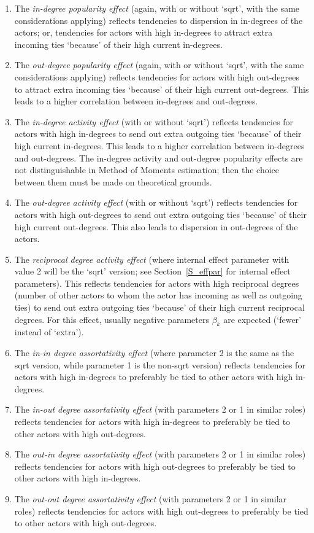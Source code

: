 \documentclass[a4paper,fleqn,11pt]{article}
\newcommand{\+}{\, + \,}
\begin{document}
\begin{enumerate}
\item The \emph{in-degree popularity effect} (again, with or without `sqrt',
     with the same considerations applying)
     reflects tendencies to dispersion in in-degrees of the actors;
     or, tendencies for actors with high in-degrees to attract extra incoming ties
     `because' of their high current in-degrees.
\item The \emph{out-degree popularity effect} (again, with or without `sqrt',
     with the same considerations applying)
     reflects tendencies for
     actors with high out-degrees to attract extra incoming ties
     `because' of their high current out-degrees.
     This leads to a higher correlation between in-degrees and out-degrees.
\item The \emph{in-degree activity effect} (with or without `sqrt')
     reflects tendencies for
     actors with high in-degrees to send out extra outgoing ties
     `because' of their high current in-degrees.
     This leads to a higher correlation between in-degrees and out-degrees.
     The in-degree activity and out-degree popularity effects are
     not distinguishable in Method of Moments estimation; then the choice between them
     must be made on theoretical grounds.
\item The \emph{out-degree activity effect} (with or without `sqrt')
     reflects tendencies for
     actors with high out-degrees to send out extra outgoing ties
     `because' of their high current out-degrees.
     This also leads to dispersion in out-degrees of the actors.
\item The \emph{ reciprocal degree activity effect} (where internal effect
     parameter with value 2 will be the `sqrt' version;
     see Section~\ref{S_effpar} for internal effect parameters).
     This reflects tendencies for
     actors with high reciprocal degrees (number of other actors
     to whom the actor has incoming as well as outgoing ties) to send out extra outgoing ties
     `because' of their high current  reciprocal degrees.
     For this effect, usually negative parameters $\beta_k$
     are expected (`fewer' instead of `extra').
\item The \emph{in-in degree assortativity effect} (where parameter 2 is the same
    as the sqrt version, while parameter 1 is the non-sqrt version)
     reflects tendencies for actors with high in-degrees
     to preferably be tied to other actors with high in-degrees.
\item The \emph{in-out degree assortativity effect} (with parameters
     2 or 1 in similar roles)
     reflects tendencies for actors with high in-degrees
     to preferably be tied to other actors with high out-degrees.
\item The \emph{out-in degree assortativity effect} (with parameters
     2 or 1 in similar roles)
     reflects tendencies for actors with high out-degrees
     to preferably be tied to other actors with high in-degrees.
\item The \emph{out-out degree assortativity effect} (with parameters
     2 or 1 in similar roles)
     reflects tendencies for actors with high out-degrees
     to preferably be tied to other actors with high out-degrees.
\end{enumerate}
\end{document}
